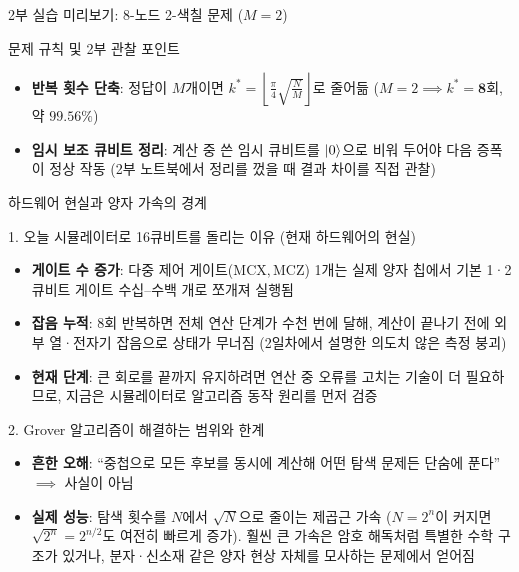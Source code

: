 \documentclass[aspectratio=169, 10pt]{beamer}
\begin{document}
\begin{frame}{2부 실습 미리보기: 8-노드 2-색칠 문제 ($M=2$)}
\begin{qcblock}{문제 규칙 및 2부 관찰 포인트}
\begin{itemize}
            \pause
            \item \textbf{반복 횟수 단축}: 정답이 $M$개이면 $k^* = \left\lfloor \frac{\pi}{4}\sqrt{\frac{N}{M}} \right\rfloor$로 줄어듦 ($M=2 \implies k^* = \mathbf{8\text{회}}$, 약 $99.56\%$)
            \pause
            \item \textbf{임시 보조 큐비트 정리}: 계산 중 쓴 임시 큐비트를 $|0\rangle$으로 비워 두어야 다음 증폭이 정상 작동 (2부 노트북에서 정리를 껐을 때 결과 차이를 직접 관찰)
        \end{itemize}
    \end{qcblock}
\end{frame}

\begin{frame}{하드웨어 현실과 양자 가속의 경계}
    \begin{qcblock}{1. 오늘 시뮬레이터로 16큐비트를 돌리는 이유 (현재 하드웨어의 현실)}
        \begin{itemize}\setlength{\itemsep}{1pt}
            \item \textbf{게이트 수 증가}: 다중 제어 게이트($\mathrm{MCX}, \mathrm{MCZ}$) 1개는 실제 양자 칩에서 기본 1·2큐비트 게이트 수십--수백 개로 쪼개져 실행됨
            \pause
            \item \textbf{잡음 누적}: 8회 반복하면 전체 연산 단계가 수천 번에 달해, 계산이 끝나기 전에 외부 열·전자기 잡음으로 상태가 무너짐 (2일차에서 설명한 의도치 않은 측정 붕괴)
            \pause
            \item \textbf{현재 단계}: 큰 회로를 끝까지 유지하려면 연산 중 오류를 고치는 기술이 더 필요하므로, 지금은 시뮬레이터로 알고리즘 동작 원리를 먼저 검증
        \end{itemize}
    \end{qcblock}
    \pause
    \vspace{0.05cm}
    \begin{qcalert}{2. Grover 알고리즘이 해결하는 범위와 한계}
        \begin{itemize}\setlength{\itemsep}{1pt}
            \item \textbf{흔한 오해}: ``중첩으로 모든 후보를 동시에 계산해 어떤 탐색 문제든 단숨에 푼다'' $\implies$ 사실이 아님
            \pause
            \item \textbf{실제 성능}: 탐색 횟수를 $N$에서 $\sqrt{N}$으로 줄이는 제곱근 가속 ($N=2^n$이 커지면 $\sqrt{2^n}=2^{n/2}$도 여전히 빠르게 증가). 훨씬 큰 가속은 암호 해독처럼 특별한 수학 구조가 있거나, 분자·신소재 같은 양자 현상 자체를 모사하는 문제에서 얻어짐
        \end{itemize}
    \end{qcalert}
\end{frame}
\end{document}
